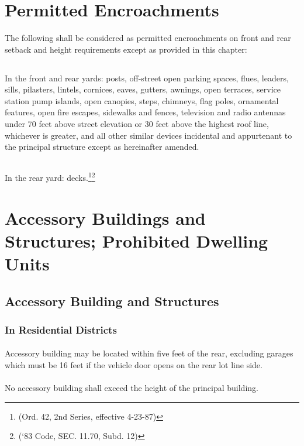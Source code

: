 \section{Permitted Encroachments}
The following shall be considered as permitted encroachments on front and rear setback and height requirements except as provided in this chapter:
\subsection{}
In the front and rear yards:  posts, off-street open parking spaces, flues, leaders, sills, pilasters, lintels, cornices, eaves, gutters, awnings, open terraces, service station pump islands, open canopies, steps, chimneys, flag poles, ornamental features, open fire escapes, sidewalks and fences, television and radio antennas under 70 feet above street elevation or 30 feet above the highest roof line, whichever is greater, and all other similar devices incidental and appurtenant to the principal structure except as hereinafter amended.
\subsection{}
In the rear yard:  decks.\footnote{(Ord. 42, 2nd Series, effective 4-23-87)}\footnote{(‘83 Code, SEC. 11.70, Subd. 12)}

\section{Accessory Buildings and Structures; Prohibited Dwelling Units}
\subsection{Accessory Building and Structures}
\subsubsection{In Residential Districts}
\paragraph{}
Accessory building may be located within five feet of the rear, excluding garages which must be 16 feet if the vehicle door opens on the rear lot line side.
\paragraph{}
No accessory building shall exceed the height of the principal building.
